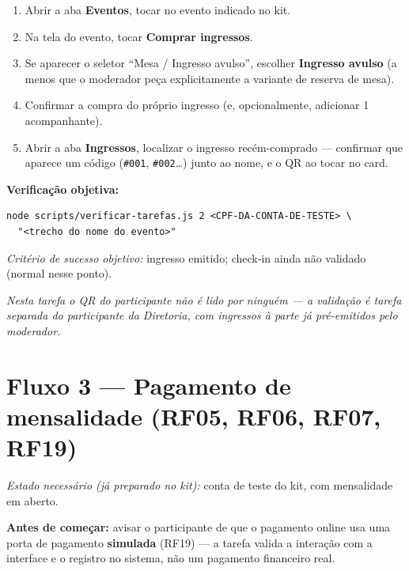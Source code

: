 \documentclass[11pt,a4paper]{article}
\newcommand{\criterio}[1]{%
  \noindent\textit{Critério de sucesso objetivo:} #1
}
\newcommand{\estado}[1]{%
  \noindent\textit{Estado necessário (já preparado no kit):} #1
  \vspace{2mm}
}
\begin{document}
\begin{enumerate}[leftmargin=6mm]
  \item Abrir a aba \textbf{Eventos}, tocar no evento indicado no kit.
  \item Na tela do evento, tocar \textbf{Comprar ingressos}.
  \item Se aparecer o seletor ``Mesa / Ingresso avulso'', escolher \textbf{Ingresso avulso} (a
    menos que o moderador peça explicitamente a variante de reserva de mesa).
  \item Confirmar a compra do próprio ingresso (e, opcionalmente, adicionar 1 acompanhante).
  \item Abrir a aba \textbf{Ingressos}, localizar o ingresso recém-comprado --- confirmar que
    aparece um código (\texttt{\#001}, \texttt{\#002}\ldots) junto ao nome, e o QR ao tocar no
    card.
\end{enumerate}

\textbf{Verificação objetiva:}
\begin{small}
\begin{verbatim}
node scripts/verificar-tarefas.js 2 <CPF-DA-CONTA-DE-TESTE> \
  "<trecho do nome do evento>"
\end{verbatim}
\end{small}
\criterio{ingresso emitido; check-in ainda não validado (normal nesse ponto).}

\vspace{1mm}
\noindent\textit{Nesta tarefa o QR do participante não é lido por ninguém --- a validação é tarefa
separada do participante da Diretoria, com ingressos à parte já pré-emitidos pelo moderador.}

\section*{Fluxo 3 --- Pagamento de mensalidade (RF05, RF06, RF07, RF19)}

\estado{conta de teste do kit, com mensalidade em aberto.}

\noindent\colorbox{lightbg}{%
  \begin{minipage}{0.95\linewidth}
  \vspace{1mm}
  \textbf{Antes de começar:} avisar o participante de que o pagamento online usa uma porta de
  pagamento \textbf{simulada} (RF19) --- a tarefa valida a interação com a interface e o registro
  no sistema, não um pagamento financeiro real.
  \vspace{1mm}
  \end{minipage}%
}
\end{document}
